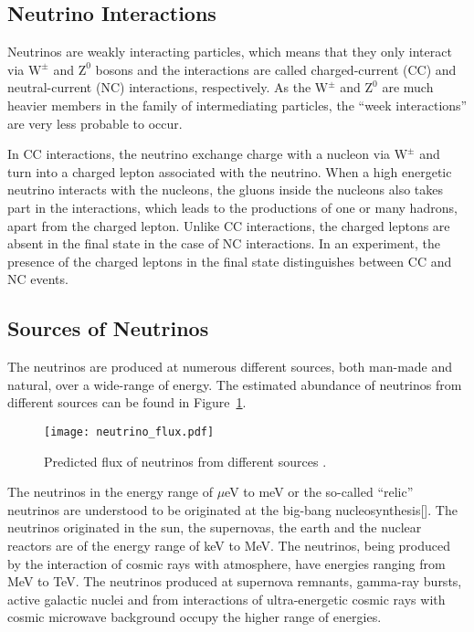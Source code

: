 \subsection{Neutrino Interactions}
Neutrinos are weakly interacting particles, which means that they only interact via $\mathrm{W}^{\pm}$ and $\mathrm{Z}^{0}$ bosons and the interactions are called charged-current (CC) and neutral-current (NC) interactions, respectively. As the $\mathrm{W}^{\pm}$ and $\mathrm{Z}^{0}$ are much heavier members in the family of intermediating particles, the ``week interactions'' are very less probable to occur.

In CC interactions, the neutrino exchange charge with a nucleon via $\mathrm{W}^{\pm}$ and turn into a charged lepton associated with the neutrino. When a high energetic neutrino interacts with the nucleons, the gluons inside the nucleons also takes part in the interactions, which leads to the productions of one or many hadrons, apart from the charged lepton. Unlike CC interactions, the charged leptons are absent in the final state in the case of NC interactions. In an experiment, the presence of the charged leptons in the final state distinguishes between CC and NC events.

\subsection{Sources of Neutrinos}
The neutrinos are produced at numerous different sources, both \mbox{man-made} and natural, over a wide-range of energy. The estimated abundance of neutrinos from different sources can be found in Figure~\ref{fig:neutrino_flux}. 
\begin{figure}[h]
  \centering
  \texttt{[image: neutrino\_flux.pdf]}
  \caption{Predicted flux of neutrinos from different sources \cite{neutrinoflux}.}
  \label{fig:neutrino_flux}
\end{figure}

The neutrinos in the energy range of $\mu$eV to meV or the so-called ``relic'' neutrinos are understood to be originated at the big-bang nucleosynthesis[\cite{nucleosynthesis}]. The neutrinos originated in the sun\cite{raydavis}, the supernovas, the earth\cite{kamland,borexino} and the nuclear reactors are of the energy range of keV to MeV. The neutrinos, being produced by the interaction of cosmic rays with atmosphere, have energies ranging from MeV to TeV. The neutrinos produced at supernova remnants, gamma-ray bursts, active galactic nuclei and from interactions of ultra-energetic cosmic rays with cosmic microwave background occupy the higher range of energies.

